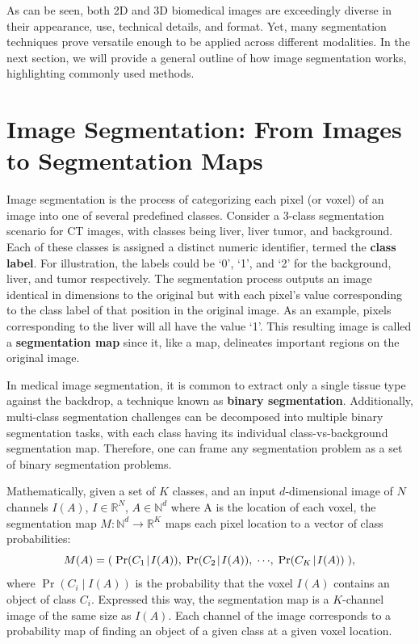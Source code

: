 As can be seen, both 2D and 3D biomedical images are exceedingly diverse in their appearance, use, technical details, and format. Yet, many segmentation techniques prove versatile enough to be applied across different modalities. In the next section, we will provide a general outline of how image segmentation works, highlighting commonly used methods.

\section{Image Segmentation: From Images to Segmentation Maps}

Image segmentation is the process of categorizing each pixel (or voxel) of an image into one of several predefined classes. Consider a 3-class segmentation scenario for CT images, with classes being liver, liver tumor, and background. Each of these classes is assigned a distinct numeric identifier, termed the \textbf{class label}. For illustration, the labels could be `0', `1', and `2' for the background, liver, and tumor respectively. The segmentation process outputs an image identical in dimensions to the original but with each pixel's value corresponding to the class label of that position in the original image. As an example, pixels corresponding to the liver will all have the value `1'. This resulting image is called a \textbf{segmentation map} since it, like a map, delineates important regions on the original image. 

In medical image segmentation, it is common to extract only a single tissue type against the backdrop, a technique known as \textbf{binary segmentation}. Additionally, multi-class segmentation challenges can be decomposed into multiple binary segmentation tasks, with each class having its individual class-vs-background segmentation map. Therefore, one can frame any segmentation problem as a set of binary segmentation problems.

Mathematically, given a set of $K$ classes, and an input $d$-dimensional image of $N$ channels $I(A)$, $I \in \mathbb{R}^{N}$, $A \in \mathbb{N}^d$ where A is the location of each voxel, the segmentation map $M : \mathbb{N}^d \rightarrow \mathbb{R}^K$ maps each pixel location to a vector of class probabilities:
\begin{equation}
M(A) = (\;\operatorname{Pr}({C_1}\!\mid\!{I(A)}),\; \operatorname{Pr}({C_2}\!\mid\!{I(A)}),\; \cdots\!,\;  \operatorname{Pr}({C_{K}}\!\mid\!{I(A)})\;),
\end{equation}
where $\operatorname{Pr} (C_i \!\mid\! I(A))$ is the probability that the voxel $I(A)$ contains an object of class $C_i$. Expressed this way, the segmentation map is a $K$-channel image of the same size as $I(A)$. Each channel of the image corresponds to a probability map of finding an object of a given class at a given voxel location. 

